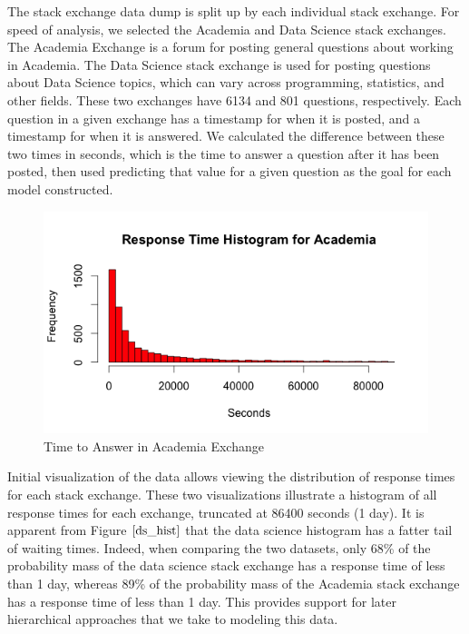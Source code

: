 \documentclass[12pt]{article}
\begin{document}
The stack exchange data dump is split up by each individual stack exchange. For speed of analysis, we selected the Academia and Data Science stack exchanges. The Academia Exchange is a forum for posting general questions about working in Academia. The Data Science stack exchange is used for posting questions about Data Science topics, which can vary across programming, statistics, and other fields. These two exchanges have 6134 and 801 questions, respectively. Each question in a given exchange has a timestamp for when it is posted, and a timestamp for when it is answered. We calculated the difference between these two times in seconds, which is the time to answer a question after it has been posted, then used predicting that value for a given question as the goal for each model constructed.

 \begin{figure}[h]
  \centering
  \includegraphics[scale = 0.5]{academia_histogram.png}
  \caption{Time to Answer in Academia Exchange}
  \label{academia_hist}
\end{figure}

Initial visualization of the data allows viewing the distribution of response times for each stack exchange. These two visualizations illustrate a histogram of all response times for each exchange, truncated at 86400 seconds (1 day). It is apparent from Figure $\ref{ds_hist}$ that the data science histogram has a fatter tail of waiting times. Indeed, when comparing the two datasets, only 68\% of the probability mass of the data science stack exchange has a response time of less than 1 day, whereas 89\% of the probability mass of the Academia stack exchange has a response time of less than 1 day. This provides support for later hierarchical approaches that we take to modeling this data. 
\end{document}
